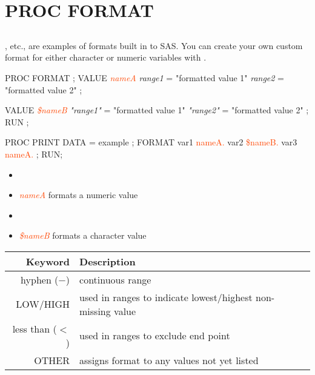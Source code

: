 \section[PROC FORMAT]{PROC FORMAT}
\subsection{}
\begin{frame}
\end{frame}

\begin{frame}[fragile]
, etc., are examples of formats built in to SAS.  You can create your own custom format for either character or numeric variables with .
\hspace{-0.3in}
\footnotesize
\begin{code}{.0}
PROC FORMAT ;
   VALUE \textcolor{OrangeRed}{\emph{nameA}} \emph{range1} = "formatted value 1"
               \emph{range2} = "formatted value 2" ;

   VALUE \textcolor{OrangeRed}{\emph{\$nameB}} \emph{"range1"} = "formatted value 1"
                \emph{"range2"} = "formatted value 2" ;
RUN ;

PROC PRINT DATA = example ;
    FORMAT var1 \textcolor{OrangeRed}{nameA.} var2 \textcolor{OrangeRed}{\$nameB.} var3 \textcolor{OrangeRed}{nameA.} ;
RUN;
\end{code}
\emp
{}
\begin{itemize}
\item[]
\item \textcolor{OrangeRed}{\emph{nameA}} formats a numeric value
\item[]
\item \textcolor{OrangeRed}{\emph{\$nameB}} formats a character value
\end{itemize}
\emp
\end{frame}


\begin{frame}
{\renewcommand{\arraystretch}{1.3}
\begin{tabular}{r p{8.0cm}}
\hline
\textbf{Keyword} &  \textbf{Description} \\
\hline
hyphen ($-$) & continuous range \\
LOW/HIGH & used in ranges to indicate lowest/highest non-missing value \\
less than ($<$) & used in ranges to exclude end point \\
OTHER & assigns format to any values not yet listed \\
\hline
\end{tabular}}
\end{frame}


